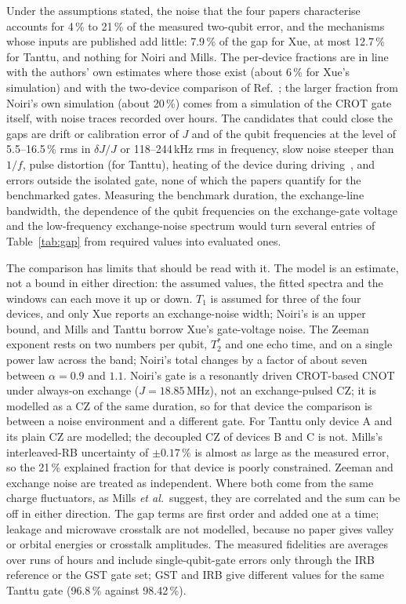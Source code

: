 \documentclass[reprint,aps,pra,floatfix,superscriptaddress,longbibliography,nofootinbib]{revtex4-2}
\newcommand{\Ts}{T_2^{*}}
\begin{document}
Under the assumptions stated, the noise that the four papers characterise accounts for 4\,\% to 21\,\% of the measured two-qubit error, and the mechanisms whose inputs are published add little: 7.9\,\% of the gap for Xue, at most 12.7\,\% for Tanttu, and nothing for Noiri and Mills. The per-device fractions are in line with the authors' own estimates where those exist (about 6\,\% for Xue's simulation) and with the two-device comparison of Ref.~; the larger fraction from Noiri's own simulation (about 20\,\%) comes from a simulation of the CROT gate itself, with noise traces recorded over hours. The candidates that could close the gaps are drift or calibration error of $J$ and of the qubit frequencies at the level of 5.5--16.5\,\% rms in $\delta J/J$ or 118--244\,kHz rms in frequency, slow noise steeper than $1/f$, pulse distortion (for Tanttu), heating of the device during driving~\cite{undseth2023}, and errors outside the isolated gate, none of which the papers quantify for the benchmarked gates. Measuring the benchmark duration, the exchange-line bandwidth, the dependence of the qubit frequencies on the exchange-gate voltage and the low-frequency exchange-noise spectrum would turn several entries of Table~\ref{tab:gap} from required values into evaluated ones.

The comparison has limits that should be read with it.
The model is an estimate, not a bound in either direction: the assumed values, the fitted spectra and the windows can each move it up or down. $T_1$ is assumed for three of the four devices, and only Xue reports an exchange-noise width; Noiri's is an upper bound, and Mills and Tanttu borrow Xue's gate-voltage noise.
The Zeeman exponent rests on two numbers per qubit, $\Ts$ and one echo time, and on a single power law across the band; Noiri's total changes by a factor of about seven between $\alpha=0.9$ and $1.1$.
Noiri's gate is a resonantly driven CROT-based CNOT under always-on exchange ($J=18.85$\,MHz), not an exchange-pulsed CZ; it is modelled as a CZ of the same duration, so for that device the comparison is between a noise environment and a different gate. For Tanttu only device A and its plain CZ are modelled; the decoupled CZ of devices B and C is not.
Mills's interleaved-RB uncertainty of $\pm0.17\,\%$ is almost as large as the measured error, so the 21\,\% explained fraction for that device is poorly constrained.
Zeeman and exchange noise are treated as independent. Where both come from the same charge fluctuators, as Mills \emph{et al.}\ suggest, they are correlated and the sum can be off in either direction.
The gap terms are first order and added one at a time; leakage and microwave crosstalk are not modelled, because no paper gives valley or orbital energies or crosstalk amplitudes.
The measured fidelities are averages over runs of hours and include single-qubit-gate errors only through the IRB reference or the GST gate set; GST and IRB give different values for the same Tanttu gate (96.8\,\% against 98.42\,\%).
\end{document}
